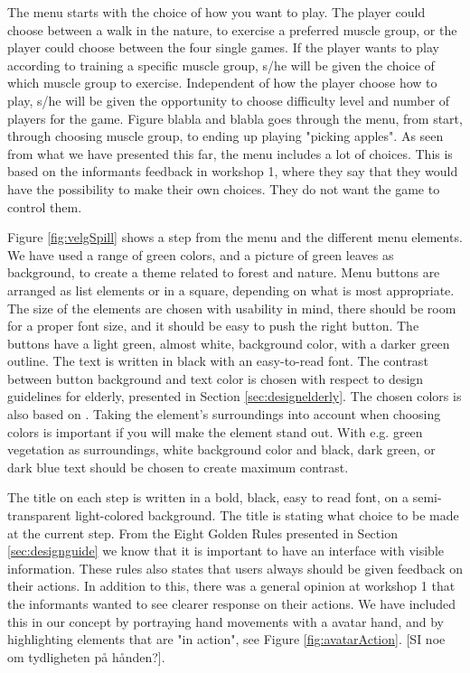 The menu starts with the choice of how you want to play. The player could choose between a walk in the nature, to exercise a preferred muscle group, or the player could choose between the four single games. If the player wants to play according to training a specific muscle group, s/he will be given the choice of which muscle group to exercise. Independent of how the player choose how to play, s/he will be given the opportunity to choose difficulty level and number of players for the game. Figure blabla and blabla goes through the menu, from start, through choosing muscle group, to ending up playing "picking apples". As seen from what we have presented this far, the menu includes a lot of choices. This is based on the informants feedback in workshop 1, where they say that they would have the possibility to make their own choices. They do not want the game to control them.   

Figure \ref{fig:velgSpill} shows a step from the menu and the different menu elements. We have used a range of green colors, and a picture of green leaves as background, to create a theme related to forest and nature. Menu buttons are arranged as list elements or in a square, depending on what is most appropriate. The size of the elements are chosen with usability in mind, there should be room for a proper font size, and it should be easy to push the right button. The buttons have a light green, almost white, background color, with a darker green outline. The text is written in black with an easy-to-read font. The contrast between button background and text color is chosen with respect to design guidelines for elderly, presented in Section \ref{sec:designelderly}. The chosen colors is also based on \cite{blindeforbundetTekst}. Taking the element's surroundings into account when choosing colors is important if you will make the element stand out. With e.g. green vegetation as surroundings, white background color and black, dark green, or dark blue text should be chosen to create maximum contrast.   

The title on each step is written in a bold, black, easy to read font, on a semi-transparent light-colored background. The title is stating what choice to be made at the current step. From the Eight Golden Rules presented in Section \ref{sec:designguide} we know that it is important to have an interface with visible information. These rules also states that users always should be given feedback on their actions. In addition to this, there was a general opinion at workshop 1 that the informants wanted to see clearer response on their actions. We have included this in our concept by portraying hand movements with a avatar hand, and by highlighting elements that are "in action", see Figure \ref{fig:avatarAction}. [SI noe om tydligheten på hånden?].  

